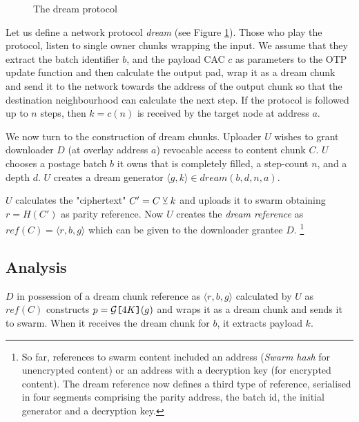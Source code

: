 \begin{figure}[htbp]
  \centering
  \caption{The dream protocol}
\label{fig:protocol}
\end{figure}


Let us  define a network protocol \emph{dream} (see Figure \ref{fig:protocol}). Those who play the protocol, listen to single owner chunks wrapping the input.
We assume that they extract the batch identifier $b$, and the payload CAC $c$ as parameters to the OTP update function and then calculate the output pad, wrap it as a dream chunk and send it to the network towards the address of the output chunk so that the destination neighbourhood 
can calculate the next step. If the protocol is followed up to $n$ steps, then $k=c(n)$ is received by the target node at address $a$. 


We now turn to the construction of dream chunks. 
Uploader $U$ wishes to grant downloader $D$ (at overlay address $a$) revocable  access to content chunk $C$.
$U$  chooses a postage batch $b$ it owns that is completely filled, a step-count $n$, and a depth $d$.
$U$ creates a dream generator $\langle g, k\rangle\in\mathit{dream}(b,d,n,a)$.              

$U$ calculates the "ciphertext" $C'=C \veebar k$ and uploads it to swarm obtaining $r=\mathit{H}(C')$ as parity reference. Now $U$ creates the \emph{dream reference} as $\mathit{ref}(C)=\langle r,b,g\rangle $ which can be given to the downloader grantee $D$.%
%
\footnote{So far, references to swarm content included an address (\emph{Swarm hash} for unencrypted content) or an address with a decryption key (for encrypted content). The dream reference now defines a third type of reference, serialised in four segments comprising the parity address, the batch id, the initial generator and a decryption key.}

\subsection{Analysis}

$D$ in possession of a dream chunk reference as 
$\langle r,b,g\rangle $ calculated by $U$  as $\mathit{ref}(C)$ constructs $p=\mathcal{G}\texttt{[}\/4K\/\texttt{]}(g)$ and wraps it as a dream chunk and sends it to swarm. When it receives the dream chunk for $b$, it extracts payload $k$.

